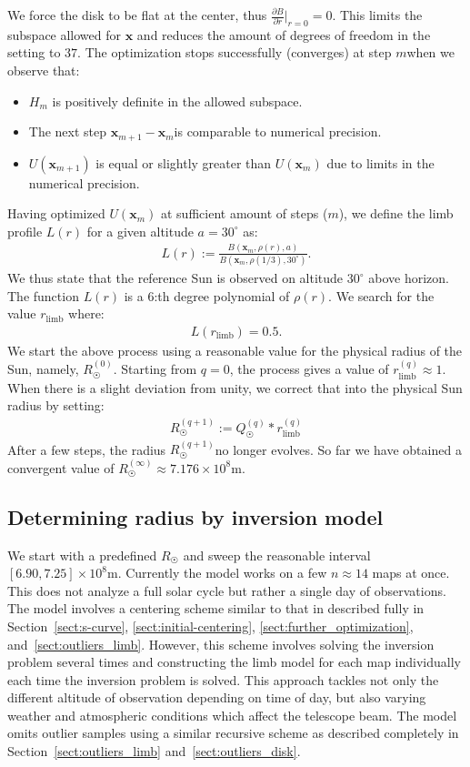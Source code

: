 \documentclass{aa}
\newcommand{\eqnl}[2]{\begin{eqnarray}\label{#1}#2\end{eqnarray}}
\newcommand{\s}[2]{{#1}_{\mathrm{#2}}}
\begin{document}
  We force the disk to be flat at the center, thus $\frac{\partial B}{\partial r}\big|_{r=0} = 0$. This limits the 
  subspace allowed for $\bm{x}$ and reduces the amount of degrees of freedom in the setting to $37$. The optimization stops successfully (converges) at step $m$when we observe that:
  \begin{itemize}
  \item $H_m$ is positively definite in the allowed subspace.
  \item The next step $\bm{x}_{m+1} - \bm{x}_{m}$is comparable to numerical precision.
  \item $U(\bm{x}_{m+1})$ is equal or slightly greater than $U(\bm{x}_m)$ due to limits in the numerical precision.
  \end{itemize}

  Having optimized $U(\bm{x}_{m})$ at sufficient amount of steps ($m$), we define the limb profile $L(r)$ for a given altitude $a = 30^{\circ}$ as:
  \eqnl{physical_radius_limb}{
  L(r) := \frac{B(\bm{x}_m, \rho(r), a)}{B(\bm{x}_m, \rho(1/3), 30^{\circ})} \text{.}
  }
  We thus state that the reference Sun is observed on altitude $30^{\circ}$ above horizon. The function $L(r)$ is a $6$:th degree polynomial of $\rho(r)$. We search for the value $\s{r}{limb}$ where:
  \eqnl{physical_radius_limb2}{
  L(\s{r}{limb}) = 0.5 \text{.}
  }
  We start the above process using a reasonable value for the physical radius of the Sun, namely, $R_{\astrosun}^{(0)}$. 
  Starting from $q=0$, the process gives a value of $\s{r}{limb}^{(q)} \approx 1$. When there is a slight deviation from 
  unity, we correct that into the physical Sun radius by setting:
  \eqnl{physical_radius_iteration}{
  R_{\astrosun}^{(q+1)} := Q_{\astrosun}^{(q)} * \s{r}{limb}^{(q)}
  }
  After a few steps, the radius $R_{\astrosun}^{(q+1)}$no longer evolves. So far we have obtained a convergent value of $R_{\astrosun}^{(\infty)} \approx 7.176 \times 10^8 \mathrm{m}$.

  \subsection{Determining radius by inversion model} \label{sect:radius_method2}

  We start with a predefined $R_{\astrosun}$ and sweep the reasonable interval $[6.90, 7.25] \times 10^8 \mathrm{m}$. 
  Currently the model works on a few $n \approx 14$ maps at once. This does not analyze a full solar cycle but rather a 
  single day of observations. The model involves a centering scheme similar to that in described fully in 
  Section~\ref{sect:s-curve}, \ref{sect:initial-centering}, \ref{sect:further_optimization}, and~\ref{sect:outliers_limb}. However, this 
  scheme involves solving the inversion problem several times and constructing the limb model for each map individually 
  each time the inversion problem is solved. This approach tackles not only the different altitude of observation 
  depending on time of day, but also varying weather and atmospheric conditions which affect the telescope beam. The 
  model omits outlier samples using a similar recursive scheme as described completely in 
  Section~\ref{sect:outliers_limb} and~\ref{sect:outliers_disk}.
\end{document}
